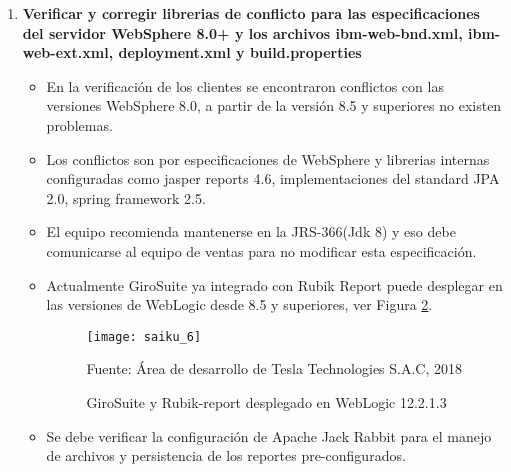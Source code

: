 \begin{spacing}{1.5}
\begin{enumerate}
\begin{itemize}
					\begin{figure}[H]
						\centering
						\texttt{[image: saiku\_6]}
						\caption {\centering \small{GiroSuite y Rubik-report desplegado en WebLogic 12.2.1.3}} \label{figure:chaperIII_8}
						\small {Fuente: \'{A}rea de desarrollo de Tesla Technologies S.A.C, 2018}
					\end{figure}
					
					\item El archivo application.xml fue modificado para contener los artefactos de rubik-report.
					\item Se debe verificar la configuraci\'{o}n de Apache Jack Rabbit para el manejo de archivos y persistencia de los reportes pre-configurados. 
				\end{itemize}
			
			\item \textbf{Verificar y corregir librerias de conflicto para las especificaciones del servidor WebSphere 8.0+ y los archivos ibm-web-bnd.xml, ibm-web-ext.xml, deployment.xml y build.properties}
				\begin{itemize}
					\item En la verificaci\'{o}n de los clientes se encontraron conflictos con las versiones WebSphere 8.0, a partir de la versi\'{o}n 8.5 y superiores no existen problemas.
					\item Los conflictos son por especificaciones de WebSphere y librerias internas configuradas como jasper reports 4.6, implementaciones del standard JPA 2.0, spring framework 2.5.
					\item El equipo recomienda mantenerse en la JRS-366(Jdk 8) y eso debe comunicarse al equipo de ventas para no modificar esta especificaci\'{o}n.
					\item Actualmente GiroSuite ya integrado con Rubik Report puede desplegar en las versiones de WebLogic desde 8.5 y superiores, ver Figura \ref{figure:chaperIII_9}.
					
					\begin{figure}[H]
						\centering
						\texttt{[image: saiku\_6]}
						\caption {\centering \small{GiroSuite y Rubik-report desplegado en WebLogic 12.2.1.3}} \label{figure:chaperIII_9}
						\small {Fuente: \'{A}rea de desarrollo de Tesla Technologies S.A.C, 2018}
					\end{figure}
					
					\item Se debe verificar la configuraci\'{o}n de Apache Jack Rabbit para el manejo de archivos y persistencia de los reportes pre-configurados. 
				\end{itemize}
			

\end{enumerate}
\end{spacing}
